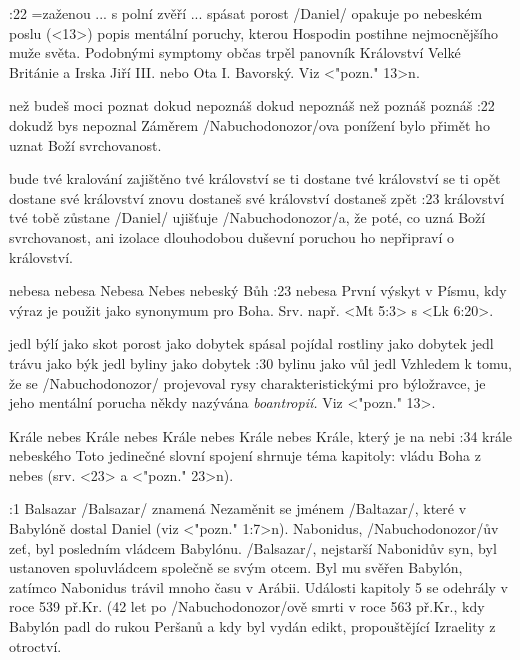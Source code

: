 :22 {}={zaženou ... s polní zvěří ... spásat porost}  \x/Daniel/ opakuje po nebeském poslu (<13>) popis mentální poruchy, kterou Hospodin postihne nejmocnějšího muže světa. Podobnými symptomy občas trpěl panovník Království Velké Británie a Irska Jiří III. nebo Ota I. Bavorský. Viz <"pozn." 13>n.

    {než budeš moci poznat}   %
    {dokud nepoznáš}   %
    {dokud nepoznáš} %
    {než poznáš}   %
    {poznáš}   %
:22 {dokudž bys nepoznal} Záměrem \x/Nabuchodonozor/ova ponížení bylo přimět ho uznat Boží svrchovanost. 

    {bude tvé kralování zajištěno}   %
    {tvé království se ti dostane}   %
    {tvé království se ti opět dostane}   %
    {své království znovu dostaneš}   %
    {své království dostaneš zpět}   %
:23 {království tvé tobě zůstane} \x/Daniel/ ujišťuje \x/Nabuchodonozor/a, že poté, co uzná Boží svrchovanost, ani izolace dlouhodobou duševní poruchou ho nepřipraví o království.

    {nebesa}   %
    {nebesa}   %
    {Nebesa}   %
    {Nebes}   %
    {nebeský Bůh}   %
:23 {nebesa}  První výskyt v Písmu, kdy výraz  je použit jako synonymum pro Boha. Srv. např.  <Mt 5:3> s <Lk 6:20>.

    {jedl býlí jako skot}   %
    {porost jako dobytek spásal}   %
    {pojídal rostliny jako dobytek}   %
    {jedl trávu jako býk}   %
    {jedl byliny jako dobytek}   %
:30 {bylinu jako vůl jedl}
     Vzhledem k tomu, že  se \x/Nabuchodonozor/ projevoval rysy charakteristickými pro býložravce, je jeho mentální porucha někdy nazývána {\em boantropií.} Viz <"pozn." 13>.

    {Krále nebes}   %
    {Krále nebes}   %
    {Krále nebes}   %
    {Krále nebes}   %
    {Krále, který je na nebi}   %
:34 {krále nebeského} Toto jedinečné slovní spojení shrnuje téma kapitoly: vládu Boha z nebes (srv. <23> a <"pozn." 23>n). 


:1 {Balsazar}
     \x/Balsazar/ znamená  
     Nezaměnit se jménem \x/Baltazar/, které v Babylóně dostal Daniel (viz <"pozn." 1:7>n). 
     Nabonidus, \x/Nabuchodonozor/ův zeť, byl posledním vládcem Babylónu. 
     \x/Balsazar/, nejstarší Nabonidův syn, byl ustanoven spoluvládcem společně se svým otcem.
     Byl mu svěřen Babylón, zatímco Nabonidus trávil mnoho času v Arábii.
     Události kapitoly 5 se odehrály v roce 539 př.Kr. (42 let po \x/Nabuchodonozor/ově
     smrti v roce 563 př.Kr., kdy Babylón padl do rukou Peršanů a kdy byl vydán
     edikt, propouštějící Izraelity z otroctví. 
     
